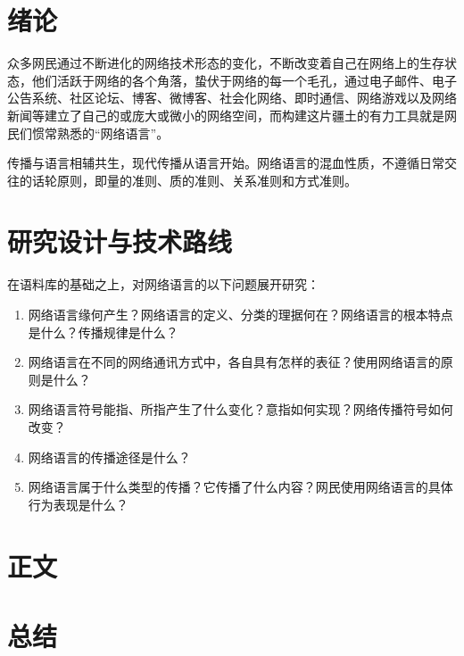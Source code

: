 \section{绪论}

众多网民通过不断进化的网络技术形态的变化，不断改变着自己在网络上的生存状态，他们活跃于网络的各个角落，蛰伏于网络的每一个毛孔，通过电子邮件、电子公告系统、社区论坛、博客、微博客、社会化网络、即时通信、网络游戏以及网络新闻等建立了自己的或庞大或微小的网络空间，而构建这片疆土的有力工具就是网民们惯常熟悉的“网络语言”。

传播与语言相辅共生，现代传播从语言开始。网络语言的混血性质，不遵循日常交往的话轮原则，即量的准则、质的准则、关系准则和方式准则。

\section{研究设计与技术路线}

在语料库的基础之上，对网络语言的以下问题展开研究：
\begin{enumerate}
\item 网络语言缘何产生？网络语言的定义、分类的理据何在？网络语言的根本特点是什么？传播规律是什么？
\item 网络语言在不同的网络通讯方式中，各自具有怎样的表征？使用网络语言的原则是什么？
\item 网络语言符号能指、所指产生了什么变化？意指如何实现？网络传播符号如何改变？
\item 网络语言的传播途径是什么？
\item 网络语言属于什么类型的传播？它传播了什么内容？网民使用网络语言的具体行为表现是什么？
\end{enumerate}

\section{正文}



\section{总结}


